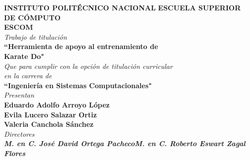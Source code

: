 \hfill
\begin{minipage}{.85\linewidth}	%
\begin{center}
{\selectfont 	%

\textbf{\LARGE INSTITUTO POLITÉCNICO NACIONAL}
\textbf{\Large ESCUELA SUPERIOR DE CÓMPUTO}\\[1.4cm]
\textbf{\LARGE ESCOM}\\[1.4cm]
\textit{\large Trabajo de titulación}\\[0.5cm]
\textbf{\Large ``Herramienta de apoyo al entrenamiento de \\Karate Do"}\\[0.5cm]
\textit{\large Que para cumplir con la opción de titulación curricular \\en la carrera de }\\[0.5cm]
\textbf{\Large ``Ingeniería en Sistemas Computacionales"}\\[1.4cm]
\textit{\large Presentan}\\[0.25cm]
\textbf{\large Eduardo Adolfo Arroyo López}\\[0.25cm]
\textbf{\large Evila Lucero Salazar Ortiz}\\[0.25cm]
\textbf{\large Valeria Canchola Sánchez}\\[1.2cm]
\textit{\large Directores}\\[0.5cm]
\textit{\textbf{M. en C. José David Ortega Pacheco\hspace{1cm}M. en C. Roberto Eswart Zagal Flores}}\\[1cm]
}
\end{center}
\end{minipage}

\newpage
\newpage{\thispagestyle{empty}\cleardoublepage}

\restoregeometry